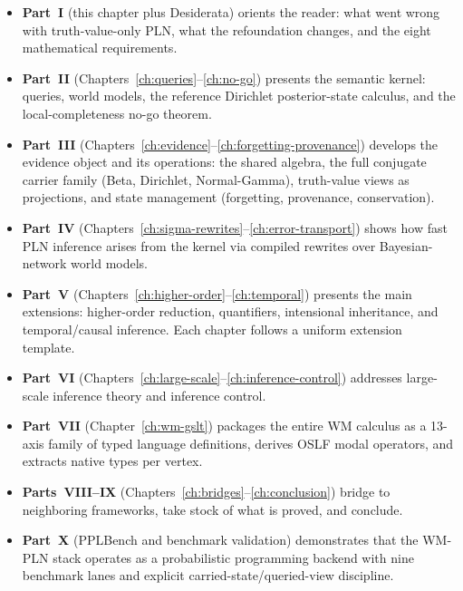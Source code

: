 \documentclass[11pt,openany]{report}
\begin{document}
\begin{itemize}
\item \textbf{Part~I} (this chapter plus Desiderata) orients the reader:
  what went wrong with truth-value-only PLN, what the refoundation changes,
  and the eight mathematical requirements.

\item \textbf{Part~II} (Chapters~\ref{ch:queries}--\ref{ch:no-go})
  presents the semantic kernel: queries, world models, the reference
  Dirichlet posterior-state calculus, and the local-completeness no-go
  theorem.

\item \textbf{Part~III} (Chapters~\ref{ch:evidence}--\ref{ch:forgetting-provenance})
  develops the evidence object and its operations: the shared algebra,
  the full conjugate carrier family (Beta, Dirichlet, Normal-Gamma),
  truth-value views as projections, and state management (forgetting,
  provenance, conservation).

\item \textbf{Part~IV} (Chapters~\ref{ch:sigma-rewrites}--\ref{ch:error-transport})
  shows how fast PLN inference arises from the kernel via compiled rewrites
  over Bayesian-network world models.

\item \textbf{Part~V} (Chapters~\ref{ch:higher-order}--\ref{ch:temporal})
  presents the main extensions: higher-order reduction, quantifiers,
  intensional inheritance, and temporal/causal inference.  Each chapter
  follows a uniform extension template.

\item \textbf{Part~VI} (Chapters~\ref{ch:large-scale}--\ref{ch:inference-control})
  addresses large-scale inference theory and inference control.

\item \textbf{Part~VII} (Chapter~\ref{ch:wm-gslt}) packages the entire WM
  calculus as a 13-axis family of typed language definitions, derives OSLF
  modal operators, and extracts native types per vertex.

\item \textbf{Parts~VIII--IX}
  (Chapters~\ref{ch:bridges}--\ref{ch:conclusion})
  bridge to neighboring frameworks, take stock of what is proved, and
  conclude.

\item \textbf{Part~X} (PPLBench and benchmark validation) demonstrates that
  the WM-PLN stack operates as a probabilistic programming backend with
  nine benchmark lanes and explicit carried-state/queried-view discipline.
\end{itemize}
\end{document}
